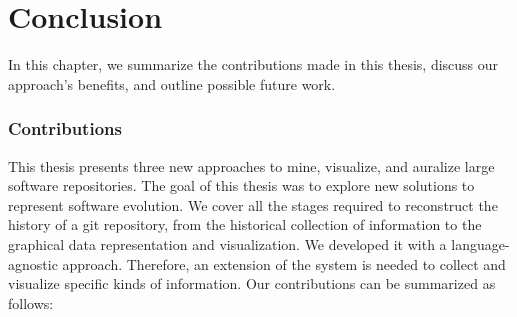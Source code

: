 \chapter{Conclusion}
In this chapter, we summarize the contributions made in this thesis, discuss our approach's benefits, and outline possible future work.

\subsection{Contributions}
This thesis presents three new approaches to mine, visualize, and auralize large software repositories. The goal of this thesis was to explore new solutions to represent software evolution. We cover all the stages required to reconstruct the history of a git repository, from the historical collection of information to the graphical data representation and visualization. We developed it with a language-agnostic approach. Therefore, an extension of the system is needed to collect and visualize specific kinds of information. Our contributions can be summarized as follows:
